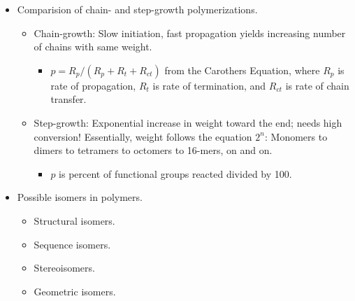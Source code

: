 \documentclass[../notes.tex]{subfiles}
\begin{document}
\begin{itemize}
\begin{itemize}
        \item Rate depends on how good the LG is; chloride is a great leaving group, which is why acid chlorides are so reactive!
        \item Note.
        \begin{itemize}
            \item This is a substitution reaction; however, the mechanism is slightly different from a normal SN2 mechanism.
            \item The electrophile can be an acid chloride, acid anhydride, ester, or just an acid, although the reaction is slower the worse the leaving group X is.
            \begin{itemize}
                \item Acids need like \SI{200}{\celsius}.
            \end{itemize}
        \end{itemize}
    \end{itemize}
    \item Comparision of chain- and step-growth polymerizations.
    \begin{itemize}
        \item Chain-growth: Slow initiation, fast propagation yields increasing number of chains with same weight.
        \begin{itemize}
            \item $p=R_p/(R_p+R_t+R_{ct})$ from the Carothers Equation, where $R_p$ is rate of propagation, $R_t$ is rate of termination, and $R_{ct}$ is rate of chain transfer.
        \end{itemize}
        \item Step-growth: Exponential increase in weight toward the end; needs high conversion! Essentially, weight follows the equation $2^n$: Monomers to dimers to tetramers to octomers to 16-mers, on and on.
        \begin{itemize}
            \item $p$ is percent of functional groups reacted divided by 100.
        \end{itemize}
    \end{itemize}
    \item Possible isomers in polymers.
    \begin{itemize}
        \item Structural isomers.
        \item Sequence isomers.
        \item Stereoisomers.
        \item Geometric isomers.

\end{itemize}
\end{itemize}
\end{document}
